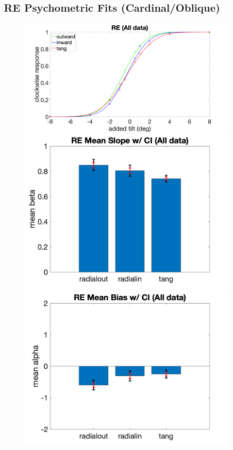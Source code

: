 \documentclass[11pt]{article} %
\begin{document}
\subsection{RE Psychometric Fits (Cardinal/Oblique)}
\begin{figure}[H]
\centering %
\includegraphics[scale=.06]{Images/PF_RE_allcond.png}
\includegraphics[scale=.11]{Images/MeanSlopeError_ci_RE_allcond.png}
\includegraphics[scale=.11]{Images/MeanBiasError_ci_RE_allcond.png}

\end{figure}
\end{document}
